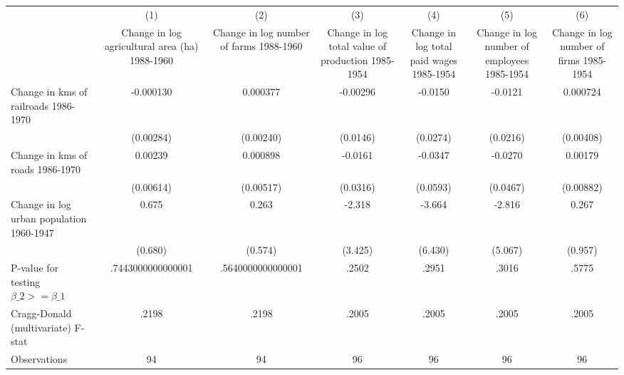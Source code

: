 {
\def\sym#1{\ifmmode^{#1}\else\(^{#1}\)\fi}
\begin{tabular}{l*{6}{c}}
\hline\hline
                &\multicolumn{1}{c}{(1)}&\multicolumn{1}{c}{(2)}&\multicolumn{1}{c}{(3)}&\multicolumn{1}{c}{(4)}&\multicolumn{1}{c}{(5)}&\multicolumn{1}{c}{(6)}\\
                &\multicolumn{1}{c}{Change in log agricultural area (ha) 1988-1960}&\multicolumn{1}{c}{Change in log number of farms 1988-1960}&\multicolumn{1}{c}{Change in log total value of production 1985-1954}&\multicolumn{1}{c}{Change in log total paid wages 1985-1954}&\multicolumn{1}{c}{Change in log number of employees 1985-1954}&\multicolumn{1}{c}{Change in log number of firms 1985-1954}\\
\hline
Change in kms of railroads 1986-1970&-0.000130         & 0.000377         & -0.00296         &  -0.0150         &  -0.0121         & 0.000724         \\
                &(0.00284)         &(0.00240)         & (0.0146)         & (0.0274)         & (0.0216)         &(0.00408)         \\
[1em]
Change in kms of roads 1986-1970&  0.00239         & 0.000898         &  -0.0161         &  -0.0347         &  -0.0270         &  0.00179         \\
                &(0.00614)         &(0.00517)         & (0.0316)         & (0.0593)         & (0.0467)         &(0.00882)         \\
[1em]
Change in log urban population 1960-1947&    0.675         &    0.263         &   -2.318         &   -3.664         &   -2.816         &    0.267         \\
                &  (0.680)         &  (0.574)         &  (3.425)         &  (6.430)         &  (5.067)         &  (0.957)         \\
\hline
P-value for testing $\beta\_{2} >= \beta\_{1}$&.7443000000000001         &.5640000000000001         &    .2502         &    .2951         &    .3016         &    .5775         \\
Cragg-Donald (multivariate) F-stat&    .2198         &    .2198         &    .2005         &    .2005         &    .2005         &    .2005         \\
Observations    &       94         &       94         &       96         &       96         &       96         &       96         \\
\hline\hline
\end{tabular}
}
